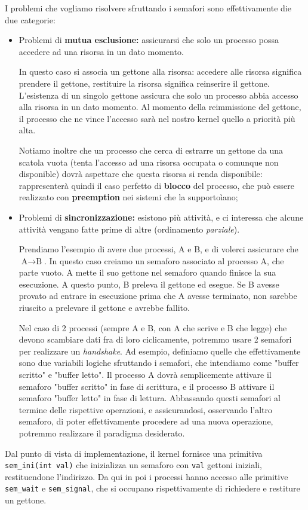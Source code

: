 \documentclass[a4paper,11pt]{article}
\begin{document}
I problemi che vogliamo risolvere sfruttando i semafori sono effettivamente die due categorie:
\begin{itemize}
	\item Problemi di \textbf{mutua esclusione:} assicurarsi che solo un processo possa accedere ad una risorsa in un dato momento.

		In questo caso si associa un gettone alla risorsa: accedere alle risorsa significa prendere il gettone, restituire la risorsa significa reinserire il gettone. L'esistenza di un singolo gettone assicura che solo un processo abbia accesso alla risorsa in un dato momento.
		Al momento della reimmissione del gettone, il processo che ne vince l'accesso sarà nel nostro kernel quello a priorità più alta.

		Notiamo inoltre che un processo che cerca di estrarre un gettone da una scatola vuota (tenta l'accesso ad una risorsa occupata o comunque non disponible) dovrà aspettare che questa risorsa si renda disponibile: rappresenterà quindi il caso perfetto di \textbf{blocco} del processo, che può essere realizzato con \textbf{preemption} nei sistemi che la supportoìano;

	\item Problemi di \textbf{sincronizzazione:} esistono più attività, e ci interessa che alcune attività vengano fatte prime di altre (ordinamento \textit{parziale}).

		Prendiamo l'esempio di avere due processi, A e B, e di volerci assicurare che $\text{A} \rightarrow \text{B}$.
		In questo caso creiamo un semaforo associato al processo A, che parte vuoto. A mette il suo gettone nel semaforo quando finisce la sua esecuzione.
		A questo punto, B preleva il gettone ed esegue.
		Se B avesse provato ad entrare in esecuzione prima che A avesse terminato, non sarebbe riuscito a prelevare il gettone e avrebbe fallito.

		Nel caso di 2 processi (sempre A e B, con A che scrive e B che legge) che devono scambiare dati fra di loro ciclicamente, potremmo usare 2 semafori per realizzare un \textit{handshake}.
		Ad esempio, definiamo quelle che effettivamente sono due variabili logiche sfruttando i semafori, che intendiamo come "buffer scritto" e "buffer letto".
		Il processo A dovrà semplicemente attivare il semaforo "buffer scritto" in fase di scrittura, e il processo B attivare il semaforo "buffer letto" in fase di lettura.
		Abbassando questi semafori al termine delle rispettive operazioni, e assicurandosi, osservando l'altro semaforo, di poter effettivamente procedere ad una nuova operazione, potremmo realizzare il paradigma desiderato. 
\end{itemize}

Dal punto di vista di implementazione, il kernel fornisce una primitiva \lstinline|sem_ini(int val)| che inizializza un semaforo con \lstinline|val| gettoni iniziali, restituendone l'indirizzo.
Da qui in poi i processi hanno accesso alle primitive \lstinline|sem_wait| e \lstinline|sem_signal|, che si occupano rispettivamente di richiedere e restiture un gettone.\
\end{document}
